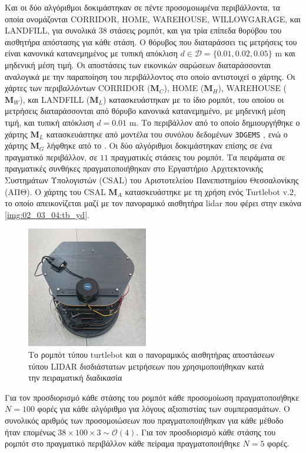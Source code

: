Και οι δύο αλγόριθμοι δοκιμάστηκαν σε πέντε προσομοιωμένα περιβάλλοντα, τα
οποία ονομάζονται CORRIDOR, HOME, WAREHOUSE, WILLOWGARAGE, και LANDFILL, για
συνολικά $38$ στάσεις ρομπότ, και για τρία επίπεδα θορύβου του αισθητήρα
απόστασης για κάθε στάση. Ο θόρυβος που διαταράσσει τις μετρήσεις του είναι
κανονικά κατανεμημένος με τυπική απόκλιση $d \in \mathcal{D} = \{0.01, 0.02,
0.05\}$ m και μηδενική μέση τιμή. Οι αποστάσεις των εικονικών σαρώσεων
διαταράσσονται αναλογικά με την παραποίηση του περιβάλλοντος στο οποίο
αντιστοιχεί ο χάρτης.  Οι χάρτες των περιβαλλόντων CORRIDOR ($\bm{M}_C$), HOME
($\bm{M}_H$), WAREHOUSE ($\bm{M}_W$), και LANDFILL ($\bm{M}_L$) κατασκευάστηκαν
με το ίδιο ρομπότ, του οποίου οι μετρήσεις διαταράσσονται από θόρυβο κανονικά
κατανεμημένο, με μηδενική μέση τιμή, και τυπική απόκλιση $d = 0.01$ m. Το
περιβάλλον από το οποίο δημιουργήθηκε ο χάρτης $\bm{M}_L$ κατασκευάστηκε από
μοντέλα του συνόλου δεδομένων \texttt{3DGEMS} \cite{Rasouli2017}, ενώ ο χάρτης
$\bm{M}_G$ λήφθηκε από το \cite{willow_map}.  Οι δύο αλγόριθμοι δοκιμάστηκαν
επίσης σε ένα πραγματικό περιβάλλον, σε $11$ πραγματικές στάσεις του ρομπότ. Τα
πειράματα σε πραγματικές συνθήκες πραγματοποιήθηκαν στο Εργαστήριο
Αρχιτεκτονικής Συστημάτων Υπολογιστών (CSAL) του Αριστοτελείου Πανεπιστημίου
Θεσσαλονίκης (ΑΠΘ). Ο χάρτης του CSAL $\bm{M}_A$ κατασκευάστηκε με τη χρήση
ενός Turtlebot v.$2$, το οποίο απεικονίζεται μαζί με τον πανοραμικό αισθητήρα
lidar που φέρει στην εικόνα \ref{img:02_03_04:tb_yd}.

\begin{figure}\centering
  \includegraphics[scale=1]{./figures/parts/02/chapters/03/sections/04/tb_yd.jpg}
  \caption{\small Το ρομπότ τύπου turtlebot και ο πανοραμικός αισθητήρας
           αποστάσεων τύπου LIDAR δισδιάστατων μετρήσεων που χρησιμοποιήθηκαν
           κατά την πειραματική διαδικασία}
  \label{img:02_03_04:tb_yd}
\label{}
\end{figure}

Για τον προσδιορισμό κάθε στάσης του ρομπότ κάθε προσομοίωση πραγματοποιήθηκε
$N = 100$ φορές για κάθε αλγόριθμο για λόγους αξιοπιστίας των συμπερασμάτων. Ο
συνολικός αριθμός των προσομοιώσεων που πραγματοποιήθηκαν για κάθε μέθοδο ήταν
επομένως $ 38 \times 100 \times 3 \sim \mathcal{O}(4)$.  Για τον προσδιορισμό
κάθε στάσης του ρομπότ στο πραγματικό περιβάλλον κάθε πείραμα πραγματοποιήθηκε
$N = 5$ φορές.

